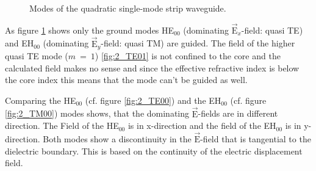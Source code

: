 \begin{figure}[ht]
\caption{Modes of the quadratic single-mode strip waveguide.}%
\label{fig:2_modes}%
\end{figure}
As figure \ref{fig:2_modes} shows only the ground modes HE$_{00}$ (dominating $\vec{\mathrm{E}}_x$-field: quasi TE) and EH$_{00}$ (dominating $\vec{\mathrm{E}}_y$-field: quasi TM) are guided. The field of the higher quasi TE mode ($m~=~1$) \ref{fig:2_TE01} is not confined to the core and the calculated field makes no sense and since the effective refractive index is below the core index this means that the mode can't be guided as well.

Comparing the HE$_{00}$ (cf. figure \ref{fig:2_TE00}) and the EH$_{00}$ (cf. figure \ref{fig:2_TM00}) modes shows, that the dominating $\vec{\mathrm{E}}$-fields are in different direction. The Field of the HE$_{00}$ is in x-direction and the field of the EH$_{00}$ is in y-direction. Both modes show a discontinuity in the $\vec{\mathrm{E}}$-field that is tangential to the dielectric boundary. This is based on the continuity of the electric displacement field.

